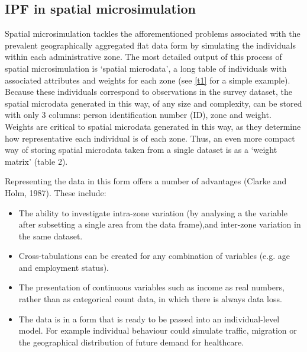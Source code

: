 \documentclass[a4paper,10pt]{article}
\begin{document}
\subsection{IPF in spatial microsimulation}
Spatial microsimulation tackles the afforementioned problems associated 
with the prevalent geographically aggregated flat data form by simulating
the individuals within each administrative zone. The most detailed output of this process of 
spatial microsimulation is `spatial microdata', a long table of individuals with 
associated attributes and weights for each zone (see \cref{t1} %
 for a simple example). 
Because these individuals correspond to observations in the survey dataset,
the spatial microdata generated in this way, of any size and complexity,
can be stored with only 3 columns: person identification number (ID), 
zone and weight. Weights are critical to spatial microdata generated in this way, as they 
determine how representative each individual is of each zone. Thus, an even more compact way 
of storing spatial microdata taken from a single dataset is as a `weight matrix' (table 2). 

Representing the data in this form offers a number of advantages (Clarke and Holm, 1987). These include:
\begin{itemize}
 \item The ability to investigate intra-zone variation (by analysing a the variable after subsetting 
a single area from the data frame),and inter-zone variation in the same dataset.
\item Cross-tabulations can be created for any combination of variables (e.g. age and employment status).
\item The presentation of continuous variables such as income as real numbers, 
rather than as categorical count data, in which there is always data loss.
\item The data is in a form that is ready to be passed into an individual-level model.
For example individual behaviour could simulate traffic, migration or the geographical distribution of future demand for healthcare.
\end{itemize}
\end{document}
